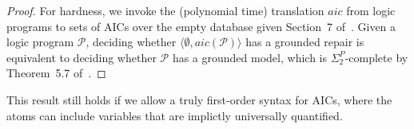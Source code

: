 {\begin{proof}
  For hardness, we invoke the (polynomial time) translation $\mathit{aic}$ from logic programs to sets of AICs over the empty database given Section~7 of~\cite{Caroprese2011}.
  Given a logic program $\mathcal P$, deciding whether $\langle\emptyset,\mathit{aic}(\mathcal P)\rangle$ has a grounded repair is equivalent to deciding whether $\mathcal P$ has a grounded model, which is $\Sigma^P_2$-complete by Theorem~5.7 of~.
\end{proof}

This result still holds if we allow a truly first-order syntax for AICs, where the atoms can include variables that are implictly universally quantified.

}
